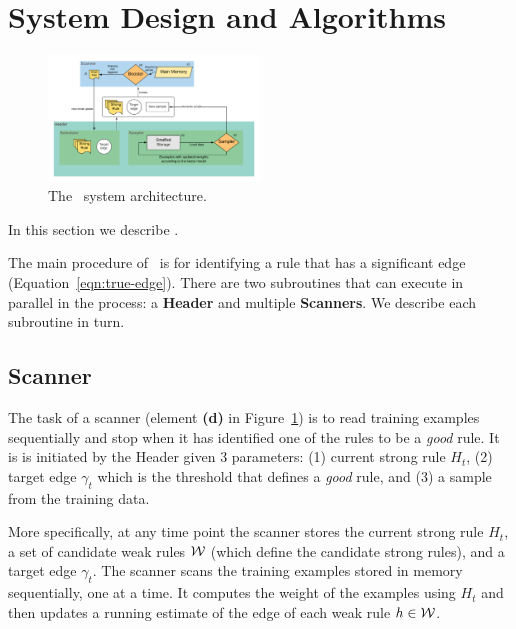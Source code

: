 \section{System Design and Algorithms} \label{sec:Algorithms}

\begin{figure}
\centering
    \includegraphics[width=0.5\textwidth]{figs/HeaderScanner.png}
    \caption{The \Sparrow\ system architecture.}\label{fig:architecture}
    \vspace{0pt}
\end{figure}

In this section we describe \Sparrow.

The main procedure of \Sparrow\ is for identifying a rule that has a significant
edge (Equation~\ref{eqn:true-edge}). There are two
subroutines that can execute in parallel in the process: a
{\bf Header } and multiple {\bf Scanners}. We describe each subroutine in turn.


\subsection*{Scanner}

The task of a scanner (element {\bf (d)} in Figure~\ref{fig:architecture})
is to read training examples sequentially and stop
when it has identified one of the rules to be a {\em good} rule.
It is is initiated by the Header given 3 parameters: (1) current
strong rule $H_t$, (2) target edge $\gamma_t$ which is the threshold
that defines a {\em good} rule, and (3) a sample from the training data.

More specifically, at any time point the scanner stores the current strong
rule $H_t$, a set of candidate weak rules ${\cal W}$ (which
define the candidate strong rules), and a target
edge $\gamma_t$. The scanner scans the training examples stored in
memory sequentially, one at a time. It computes the weight of the
examples using $H_t$ and then updates a running estimate of the edge
of each weak rule $h \in {\cal W}$.

